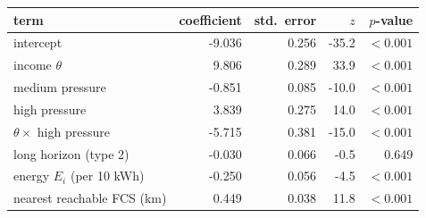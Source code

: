 \begin{tabular}{@{}lrrrr@{}}
\toprule
term & coefficient & std.\ error & $z$ & $p$-value \\
\midrule
intercept & -9.036 & 0.256 & -35.2 & $<0.001$ \\
income $\theta$ & 9.806 & 0.289 & 33.9 & $<0.001$ \\
medium pressure & -0.851 & 0.085 & -10.0 & $<0.001$ \\
high pressure & 3.839 & 0.275 & 14.0 & $<0.001$ \\
$\theta\times$ high pressure & -5.715 & 0.381 & -15.0 & $<0.001$ \\
long horizon (type 2) & -0.030 & 0.066 & -0.5 & 0.649 \\
energy $E_i$ (per 10 kWh) & -0.250 & 0.056 & -4.5 & $<0.001$ \\
nearest reachable FCS (km) & 0.449 & 0.038 & 11.8 & $<0.001$ \\
\bottomrule
\end{tabular}
